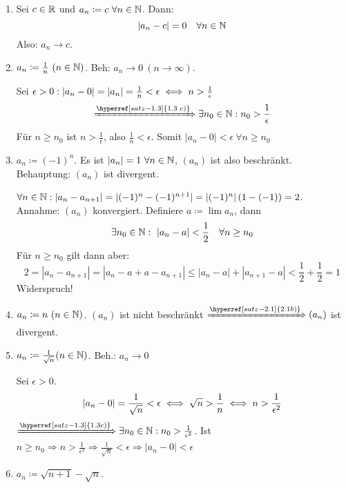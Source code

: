 \begin{beispiele*}
	\begin{enumerate}
		\item Sei $c \in \mathbb{R}$ und $a_{n} \coloneqq c ~\forall n \in \mathbb{N}$. Dann:
			$$
				| a_{n} - c | = 0 \quad \forall n \in \mathbb{N}
			$$
			Also: $a_{n} \rightarrow c$.
		\item $a_{n} \coloneqq \frac{1}{n} ~(n \in \mathbb{N})$. Beh: $a_{n} \rightarrow 0 ~(n \rightarrow \infty)$.
			\begin{beweis}
				Sei $\epsilon > 0: |a_{n} - 0 | = |a_{n}| = \frac{1}{n} < \epsilon \iff n > \frac{1}{\epsilon}$
				$$
						\xRightarrow[]{\hyperref[satz-1.3]{\text{1.3 c)}}} \exists n_{0} \in \N: n_{0} > \frac{1}{\epsilon}
				$$
				Für $n \geq n_{0}$ ist $n > \frac{1}{\epsilon}$, also $\frac{1}{n} < \epsilon$. Somit $|a_{n} - 0| < \epsilon ~\forall n \geq n_{0}$
			\end{beweis}
		\item $a_{n} \coloneqq (-1)^{n}$. Es ist $|a_{n}| = 1 ~\forall n \in \mathbb{N}$, $(a_{n})$ ist also beschränkt. Behauptung: $(a_{n})$ ist divergent.
			\begin{beweis}
				$\forall n \in \mathbb{N}: |a_{n} - a_{n+1}| = |(-1)^{n} - (-1)^{n+1}| = |(-1)^{n}| \left( 1 - (-1) \right) = 2$. \\
				Annahme: $(a_{n})$ konvergiert. Definiere $a \coloneqq \lim a_{n}$, dann 
				$$
					 \exists n_{0} \in \mathbb{N}: ~ |a_{n} - a| < \frac{1}{2} \quad \forall n \geq n_{0}
				$$
				Für $n \geq n_{0}$ gilt dann aber:
				$$
					2 = |a_{n} - a_{n+1}| = |a_{n} - a + a - a_{n + 1}| \leq |a_{n} - a| + |a_{n+1} - a| < \frac{1}{2} + \frac{1}{2} = 1
				$$
				Widerspruch!
			\end{beweis}
		\item $a_{n} \coloneqq n ~(n \in \mathbb{N})$. $(a_{n})$ ist nicht beschränkt $\xRightarrow[]{\hyperref[satz-2.1]{2.1 b)}} (a_{n})$ ist divergent.
		\item $a_{n} \coloneqq  \frac{1}{\sqrt{n}} (n \in \mathbb{N})$. Beh.: $a_{n} \rightarrow 0$
			\begin{beweis}
				Sei $\epsilon > 0$.
				$$
					|a_{n} - 0| = \frac{1}{\sqrt{n}} < \epsilon \iff \sqrt{n} > \frac{1}{n} \iff n > \frac{1}{\epsilon^{2}}
				$$
				$\xRightarrow[]{\hyperref[satz-1.3]{1.3 c)}} \exists n_{0} \in \N: n_{0} > \frac{1}{\epsilon^{2}}$. Ist $n \geq n_{0} \Rightarrow n > \frac{1}{\epsilon^{2}} \Rightarrow \frac{1}{\sqrt{n}} < \epsilon \Rightarrow |a_{n} - 0 | < \epsilon$ 
			\end{beweis}
		\item $a_{n} \coloneqq \sqrt{n + 1} - \sqrt{n}$. 

\end{enumerate}
\end{beispiele*}
